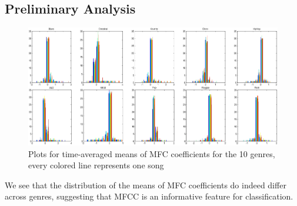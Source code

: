 \subsection{Preliminary Analysis}
\begin{figure}[h]
	\includegraphics[width=\textwidth]{histgram_mfcc.png}
	\caption{Plots for time-averaged means of MFC coefficients for the 10 genres, every colored line represents one song}
\end{figure}
We see that the distribution of the means of MFC coefficients do indeed differ across genres, suggesting that MFCC is an informative feature for classification.


